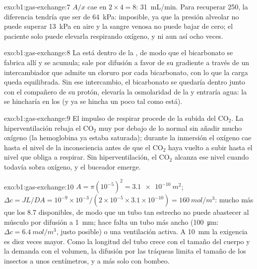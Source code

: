 \begin{solution}{exo:b1:gas-exchange:7}
$A/x$ cae en $2\times 4 = 8$: \qty{31}{mL/min}. Para recuperar \qty{250}{},
la diferencia tendría que ser de \qty{64}{kPa}: imposible, ya que la presión
alveolar no puede superar \qty{13}{kPa} en aire y la sangre venosa no puede
bajar de cero; el paciente solo puede elevarla respirando oxígeno, y ni aun
así ocho veces.
\end{solution}

\begin{solution}{exo:b1:gas-exchange:8}
La  está dentro de la , de modo que el bicarbonato
se fabrica allí y se acumula; sale por difusión a favor de su gradiente a
través de un intercambiador que admite un cloruro por cada bicarbonato, con
lo que la carga queda equilibrada. Sin ese intercambio, el bicarbonato se
quedaría dentro junto con el compañero de su protón, elevaría la osmolaridad
de la  y entraría agua: la  se hincharía en los  (y ya se
hincha un poco tal como está).
\end{solution}

\begin{solution}{exo:b1:gas-exchange:9}
El impulso de respirar procede de la subida del $\mathrm{CO_2}$. La
hiperventilación rebaja el $\mathrm{CO_2}$ muy por debajo de lo normal sin
añadir mucho oxígeno (la hemoglobina ya estaba saturada); durante la
inmersión el oxígeno cae hasta el nivel de la inconsciencia antes de que el
$\mathrm{CO_2}$ haya vuelto a subir hasta el nivel que obliga a respirar.
Sin hiperventilación, el $\mathrm{CO_2}$ alcanza ese nivel cuando todavía
sobra oxígeno, y el buceador emerge.
\end{solution}

\begin{solution}{exo:b1:gas-exchange:10}
$A = \pi(10^{-5})^2 = \qty{3.1e-10}{m^2}$; $\Delta c = JL/DA =
10^{-9}\times 10^{-3}/(2\times 10^{-5}\times 3.1\times 10^{-10}) =
\qty{160}{mol/m^3}$: mucho más que los \qty{8.7}{} disponibles, de modo que
un tubo tan estrecho no puede abastecer al músculo por difusión a
\qty{1}{mm}; hace falta un tubo más ancho (\qty{100}{\micro m}:
$\Delta c = \qty{6.4}{mol/m^3}$, justo posible) o una ventilación activa. A
\qty{10}{mm} la exigencia es diez veces mayor. Como la longitud del tubo
crece con el tamaño del cuerpo y la demanda con el volumen, la difusión por
las tráqueas limita el tamaño de los insectos a unos centímetros, y a más
solo con bombeo.
\end{solution}

